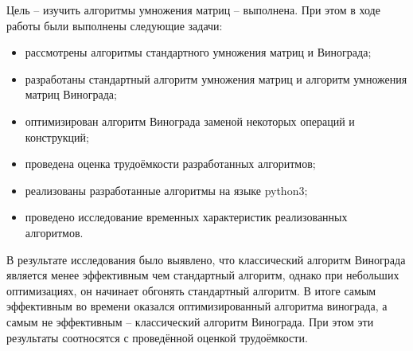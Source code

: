 
Цель – изучить алгоритмы умножения матриц – выполнена.
При этом в ходе работы были выполнены следующие задачи:

\begin{itemize}
	\item рассмотрены алгоритмы стандартного умножения матриц и Винограда;
	\item разработаны стандартный алгоритм умножения матриц и алгоритм умножения матриц Винограда; 
	\item оптимизирован алгоритм Винограда заменой некоторых операций и конструкций; 
	\item проведена оценка трудоёмкости разработанных алгоритмов;
	\item реализованы разработанные алгоритмы на языке python3;
	\item проведено исследование временных характеристик реализованных алгоритмов.
\end{itemize}

В результате исследования было выявлено, что классический алгоритм Винограда является менее эффективным чем стандартный алгоритм, однако при небольших оптимизациях, он начинает обгонять стандартный алгоритм. В итоге самым эффективным во времени оказался оптимизированный алгоритма винограда, а самым не эффективным – классический алгоритм Винограда. При этом эти результаты соотносятся с проведённой оценкой трудоёмкости.
